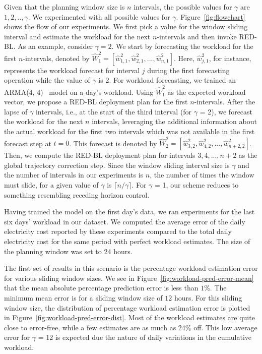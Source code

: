     Given that the planning window size is $n$ intervals, the possible values for $\gamma$ are $1, 2, .., \gamma$. We experimented with all possible values for $\gamma$. Figure~\ref{fig:flowchart} shows the flow of our experiments. We first pick a value for the window sliding interval and estimate the workload for the next $n$-intervals and then invoke RED-BL. As an example, consider $\gamma=2$. We start by forecasting the workload for the first $n$-intervals, denoted by $\hat{W}_1^2 = [\hat{w}_{1,1}^2, \hat{w}_{2,1}^2, ..., \hat{w}_{n,1}^2]$. Here, $\hat{w}_{j,1}^2$, for instance, represents the workload forecast for interval $j$ during the first forecasting operation while the value of $\gamma$ is 2. For workload forecasting, we trained an ARMA(4, 4)~\cite{arma} model on a day's workload. Using $\hat{W}^2_1$ as the expected workload vector, we propose a RED-BL deployment plan for the first $n$-intervals. After the lapse of $\gamma$ intervals, i.e., at the start of the third interval (for $\gamma$ = 2), we forecast the workload for the next $n$ intervals, leveraging the additional information about the actual workload for the first two intervals which was not available in the first forecast step at $t=0$. This forecast is denoted by $\hat{W}_2^2 = [\hat{w}_{3,2}^2, \hat{w}_{4,2}^2, ..., \hat{w}_{n+2,2}^2]$. Then, we compute the RED-BL deployment plan for intervals $3, 4,..., n+2$ as the global trajectory correction step. Since the window sliding interval size is $\gamma$ and the number of intervals in our experiments is $n$, the number of times the window must slide, for a given value of $\gamma$ is $\lceil n/\gamma \rceil$. For $\gamma$ = 1, our scheme reduces to something resembling receding horizon control.
    

Having trained the model on the first day's data, we ran experiments for the last six days' workload in our dataset. We computed the average error of the daily electricity cost reported by these experiments compared to the total daily electricity cost for the same period with perfect workload estimates. The size of the planning window was set to 24 hours. 

The first set of results in this scenario is the percentage workload estimation error for various sliding window sizes. We see in Figure~\ref{fig:workload-pred-error-mean} that the mean absolute percentage prediction error is less than $1\%$. The minimum mean error is for a sliding window size of $12$ hours. For this sliding window size, the distribution of percentage workload estimation error is plotted in Figure~\ref{fig:workload-pred-error-dist}. Most of the workload estimates are quite close to error-free, while a few estimates are as much as 24$\%$ off. This low average error for $\gamma$ = 12 is expected due the nature of daily variations in the cumulative workload.

